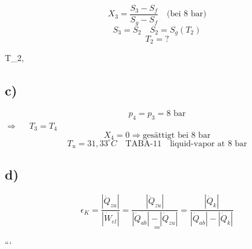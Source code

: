 \[
X_3 = \frac{S_3 - S_f}{S_g - S_f} \quad \text{(bei 8 bar)}
\]
\[
S_3 = S_2 \quad S_2 = S_g(T_2)
\]
\[
T_2 = ?
\]

 T_2, 

\subsection*{c)}
\[
p_4 = p_3 = 8 \text{ bar}
\]
 \(\Rightarrow\)  \(\quad T_3 = T_4\)
\[
X_4 = 0 \Rightarrow \text{gesättigt bei 8 bar}
\]
\[
T_u = 31,33^\circ C \quad \text{TABA-11} \quad \text{liquid-vapor at 8 bar}
\]

\subsection*{d)}
\[
\epsilon_K = \frac{|\dot{Q}_{zu}|}{|\dot{W}_{el}|} = \frac{|\dot{Q}_{zu}|}{|\dot{Q}_{ab}| - |\dot{Q}_{zu}|} = \frac{|\dot{Q}_{k}|}{|\dot{Q}_{ab}| - |\dot{Q}_{k}|}
\]
\[
=
\]

```
